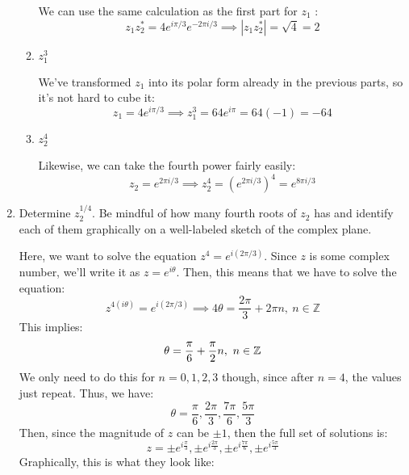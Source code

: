 \documentclass[10pt]{article}
\begin{document}
\begin{enumerate}[label=\alph*)]
\begin{enumerate}[label=\roman*)]
					\begin{solution}
						We can use the same calculation as the first part for \( z_1 \) :
						\[
							z_1z_2^* = 4e^{i \pi / 3} e^{-2 \pi i / 3} \implies |z_1z_2^*| = \sqrt{4} = 2
						\] 
					\end{solution}
				\item \( z_1^3 \) 

					\begin{solution}
						We've transformed \( z_1 \) into its polar form already in the previous parts, so it's not 
						hard to cube it:
						\[
						z_1 = 4e^{i \pi /3} \implies z_1^3 = 64e^{i \pi} = 64(-1) = -64
						\] 
					\end{solution}
				\item \( z_2^{4} \)

					\begin{solution}
						Likewise, we can take the fourth power fairly easily:
						\[
						z_2 = e^{2 \pi i / 3} \implies z_2^{4} = \left( e^{2 \pi i / 3} \right) ^{4} = 
						e^{8 \pi i / 3}
						\] 
					\end{solution}
			\end{enumerate}
		\item Determine \( z_2^{1 / 4} \). Be mindful of how many fourth roots of \( z_2 \) has and identify each 
			of them graphically on a well-labeled sketch of the complex plane. 

			\begin{solution}
				Here, we want to solve the equation \( z^{4} = e^{i( 2\pi / 3)} \). Since \( z \) is some complex 
				number, we'll write it as \( z = e^{i \theta} \). Then, this means that we have to solve the
				equation:
				\[ 
				z^{4(i \theta)} = e^{i(2 \pi /3)} \implies 4\theta = \frac{2\pi}{3} + 2\pi n, \ n \in \mathbb Z
				\] 
				This implies: 
				\[
				\theta = \frac{\pi}{6} + \frac{\pi}{2}n, \ n \in \mathbb Z
				\] 
				We only need to do this for \( n = 0, 1, 2, 3 \) though, since after \(  n = 4 \), the values just 
				repeat. Thus, we have:
				\[
				\theta = \frac{\pi}{6}, \frac{2\pi}{3}, \frac{7\pi}{6}, \frac{5\pi}{3}
				\] 
				Then, since the magnitude of \( z \) can be \( \pm 1 \), then the full set of 
				solutions is:
				\[
				z = \pm e^{i\frac{\pi}{3}}, \pm e^{i \frac{2\pi}{3}}, \pm e^{i \frac{7\pi}{6}}, \pm e^{i \frac{5\pi}{3}}
				\] 
				Graphically, this is what they look like:
				\begin{center}
				\end{center}
			\end{solution}
	\end{enumerate}
	\pagebreak
\end{document}
